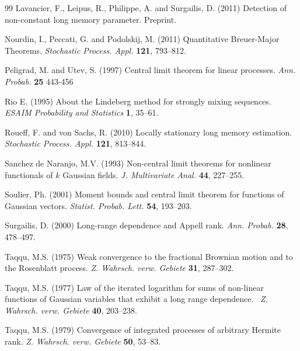 \documentclass[10pt]{article}
\begin{document}
\begin{thebibliography}{99}
 Lavancier, F., Leipus, R., Philippe, A. and Surgailis, D. (2011) Detection of non-constant long memory parameter.
Preprint.



 Nourdin, I., Peccati, G. and Podolskij, M. (2011) Quantitative Breuer-Major Theorems. {\em Stochastic Process. Appl. } {\bf 121}, 793--812.

 Peligrad, M. and Utev, S. (1997)
Central limit theorem for linear processes.
{\em Ann. Probab.} {\bf 25} 443-456

 Rio E. (1995) About the Lindeberg method for strongly mixing sequences. {\em  ESAIM Probability
and Statistics} {\bf 1}, 35--61.

 Roueff, F. and von Sachs, R. (2010) Locally stationary long memory estimation. {\em Stochastic Process. Appl. } {\bf 121}, 813--844.

 Sanchez de Naranjo, M.V. (1993)
Non-central limit theorems for nonlinear functionals of $k$ Gaussian fields. {\em
J. Multivariate Anal.} {\bf 44}, 227--255.

 Soulier, Ph. (2001)  Moment bounds and central limit theorem for
functions of Gaussian vectors. {\em Statist. Probab. Lett.} {\bf
54}, 193--203.

 Surgailis, D. (2000) Long-range dependence and Appell rank.
{\em Ann. Probab.} {\bf 28}, 478--497.

 Taqqu, M.S.  (1975) Weak convergence to the fractional Brownian
motion and to the Rosenblatt process. {\em  Z. Wahrsch. verw. Gebiete} {\bf 31},  287--302.

 Taqqu, M.S. (1977)  Law of the iterated logarithm for sums of
non-linear functions of Gaussian variables that exhibit a long range
dependence. \ {\em Z. Wahrsch. verw. Gebiete} {\bf 40}, 203--238.

  Taqqu, M.S. (1979)
Convergence of integrated processes of arbitrary Hermite rank.
{\em Z. Wahrsch. verw. Gebiete} {\bf 50}, 53--83.
\end{thebibliography}
\end{document}
